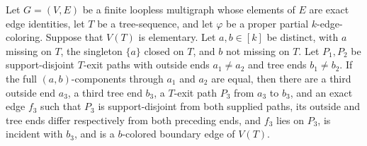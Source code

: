 \begin{helper}
Let $G=(V,E)$ be a finite loopless multigraph whose elements of $E$ are
exact edge identities, let $T$ be a tree-sequence, and let $\varphi$ be a
proper partial $k$-edge-coloring.  Suppose that $V(T)$ is elementary.
Let $a,b\in[k]$ be distinct, with $a$ missing on $T$, the singleton
$\{a\}$ closed on $T$, and $b$ not missing on $T$.  Let $P_1,P_2$ be
support-disjoint $T$-exit paths with outside ends $a_1\ne a_2$ and tree
ends $b_1\ne b_2$.  If the full $(a,b)$-components through $a_1$ and
$a_2$ are equal, then there are a third outside end $a_3$, a third tree
end $b_3$, a $T$-exit path $P_3$ from $a_3$ to $b_3$, and an exact edge
$f_3$ such that $P_3$ is support-disjoint from both supplied paths, its
outside and tree ends differ respectively from both preceding ends, and
$f_3$ lies on $P_3$, is incident with $b_3$, and is a $b$-colored
boundary edge of $V(T)$.
\end{helper}

